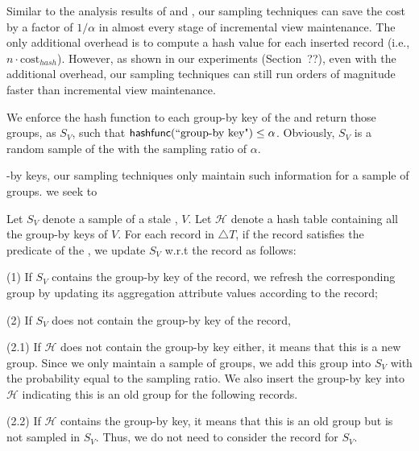 Similar to the analysis results of \spview and \fjview, our sampling techniques can save the cost by a factor of $1/\alpha$ in almost every stage of incremental view maintenance. The only additional overhead is to compute a hash value for each inserted record (i.e., $n\cdot \textrm{cost}_{hash}$). However, as shown in our experiments (Section~??), even with the additional overhead, our sampling techniques can still run orders of magnitude faster than incremental view maintenance.

\iffalse
We enforce the hash function to each group-by key of the \aggview and return those groups, as $S_{V}$, such that $\textsf{hashfunc}(\textrm{``group-by key"}) \leq \alpha$. Obviously, $S_{V}$ is a random sample of the \aggview with the sampling ratio of $\alpha$. 

-by keys, our sampling techniques only maintain such information for a sample of groups. we seek to 


 

Let $S_{V}$ denote a sample of a stale \aggview, $V$. Let $\mathcal{H}$ denote a hash table containing all the group-by keys of $V$. For each record in $\triangle T$, if the record satisfies the predicate of the \aggview, we update $S_{V}$ w.r.t the record as follows: 
\vspace{.25em}

(1) If $S_{V}$ contains the group-by key of the record, we refresh the corresponding group by updating its aggregation attribute values according to the record;

\vspace{.25em}

(2) If $S_{V}$ does not contain the group-by key of the record,

\vspace{.25em}

(2.1) If $\mathcal{H}$ does not contain the group-by key either, it means that this is a new group. Since we only maintain a sample of groups, we add this group into $S_{V}$ with the probability equal to the sampling ratio. We also insert the group-by key into $\mathcal{H}$ indicating this is an old group for the following records.

\vspace{.25em}

(2.2) If $\mathcal{H}$ contains the group-by key, it means that this is an old group but is not sampled in $S_{V}$. Thus, we do not need to consider the record for $S_{V}$.




